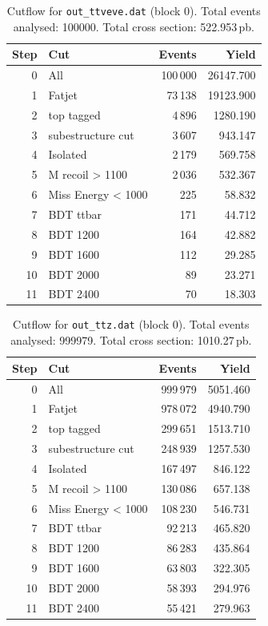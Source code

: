 \documentclass{article}
\begin{document}
\begin{table}[H]
\centering
\begin{tabular}{r l r r}
\toprule
Step & Cut & Events & Yield \\
\midrule
0 & All & 100\,000 & 26147.700 \\
1 & Fatjet & 73\,138 & 19123.900 \\
2 & top tagged & 4\,896 & 1280.190 \\
3 & subestructure cut & 3\,607 & 943.147 \\
4 & Isolated & 2\,179 & 569.758 \\
5 & M recoil > 1100 & 2\,036 & 532.367 \\
6 & Miss Energy < 1000 & 225 & 58.832 \\
7 & BDT ttbar & 171 & 44.712 \\
8 & BDT 1200 & 164 & 42.882 \\
9 & BDT 1600 & 112 & 29.285 \\
10 & BDT 2000 & 89 & 23.271 \\
11 & BDT 2400 & 70 & 18.303 \\
\bottomrule
\end{tabular}
\caption{Cutflow for \texttt{out\_ttveve.dat} (block 0). Total events analysed: 100000. Total cross section: 522.953\,pb.}
\label{tab:cutflow-out-ttveve-dat}
\end{table}

\begin{table}[H]
\centering
\begin{tabular}{r l r r}
\toprule
Step & Cut & Events & Yield \\
\midrule
0 & All & 999\,979 & 5051.460 \\
1 & Fatjet & 978\,072 & 4940.790 \\
2 & top tagged & 299\,651 & 1513.710 \\
3 & subestructure cut & 248\,939 & 1257.530 \\
4 & Isolated & 167\,497 & 846.122 \\
5 & M recoil > 1100 & 130\,086 & 657.138 \\
6 & Miss Energy < 1000 & 108\,230 & 546.731 \\
7 & BDT ttbar & 92\,213 & 465.820 \\
8 & BDT 1200 & 86\,283 & 435.864 \\
9 & BDT 1600 & 63\,803 & 322.305 \\
10 & BDT 2000 & 58\,393 & 294.976 \\
11 & BDT 2400 & 55\,421 & 279.963 \\
\bottomrule
\end{tabular}
\caption{Cutflow for \texttt{out\_ttz.dat} (block 0). Total events analysed: 999979. Total cross section: 1010.27\,pb.}
\label{tab:cutflow-out-ttz-dat}
\end{table}
\end{document}
